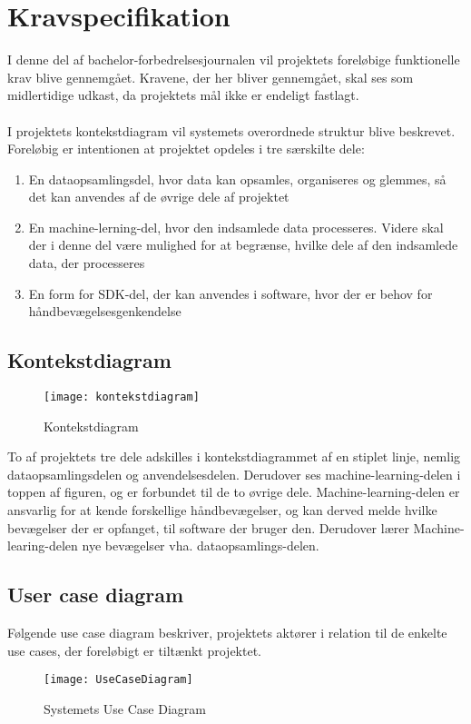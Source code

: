 \thispagestyle{fancy}
\chapter{Kravspecifikation}
I denne del af bachelor-forbedrelsesjournalen vil projektets foreløbige funktionelle krav blive gennemgået. Kravene, der her bliver gennemgået, skal ses som midlertidige udkast, da projektets mål ikke er endeligt fastlagt.
\\ \\
I projektets kontekstdiagram vil systemets overordnede struktur blive beskrevet. \\
Foreløbig er intentionen at projektet opdeles i tre særskilte dele:\\
\begin{enumerate}
	\item En dataopsamlingsdel, hvor data kan opsamles, organiseres og glemmes, så det kan anvendes af de øvrige dele af projektet
	\item En machine-lerning-del, hvor den indsamlede data processeres. Videre skal der i denne del være mulighed for at begrænse, hvilke dele af den indsamlede data, der processeres
	\item En form for SDK-del, der kan anvendes i software, hvor der er behov for håndbevægelsesgenkendelse
	
\end{enumerate}

\section{Kontekstdiagram}
\begin{figure}[h!]
	\centering
	\texttt{[image: kontekstdiagram]}
	\caption{Kontekstdiagram }
	\label{fighrj}
\end{figure}
To af projektets tre dele adskilles i kontekstdiagrammet af en stiplet linje, nemlig dataopsamlingsdelen og anvendelsesdelen. Derudover ses machine-learning-delen i toppen af figuren, og er forbundet til de to øvrige dele. Machine-learning-delen er  ansvarlig for at kende forskellige håndbevægelser, og kan derved melde hvilke bevægelser der er opfanget, til software der bruger den. Derudover lærer Machine-learing-delen nye bevægelser vha. dataopsamlings-delen.

\section{User case diagram}
Følgende use case diagram beskriver, projektets aktører i relation til de enkelte use cases, der foreløbigt er tiltænkt projektet.\\
\begin{figure}[h!]
	\centering
	\texttt{[image: UseCaseDiagram]}
	\caption{Systemets Use Case Diagram}
\end{figure}

